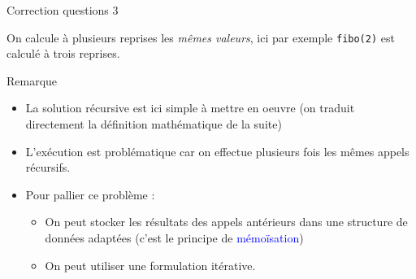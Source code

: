 \documentclass[10pt]{beamer}
\begin{document}
\begin{frame}{\Ctitle}{\stitle}
	\begin{exampleblock}{Correction questions 3}
		\begin{center}
		\end{center} \medskip
		{\small On calcule à plusieurs reprises les \textit{mêmes valeurs}, ici par exemple \textcolor{BrickRed}{\tt fibo(2)} est calculé à trois reprises.}
	\end{exampleblock}
\end{frame}

\begin{frame}[fragile]{\Ctitle}{\stitle}
	\begin{block}{Remarque}
		\begin{itemize}
			\item<1-> La solution récursive est ici simple à mettre en oeuvre (on traduit directement la définition mathématique de la suite)
			\item<2-> L'exécution est problématique car on effectue plusieurs fois les mêmes appels récursifs.
			\item<3-> Pour pallier ce problème :
				\begin{itemize}
					\item<4-> On peut stocker les résultats des appels antérieurs dans une structure de données adaptées (c'est le principe de \textcolor{blue}{mémoïsation})
					\item<5-> On peut utiliser une formulation itérative.
				\end{itemize}
		\end{itemize}
	\end{block}
\end{frame}
\end{document}
